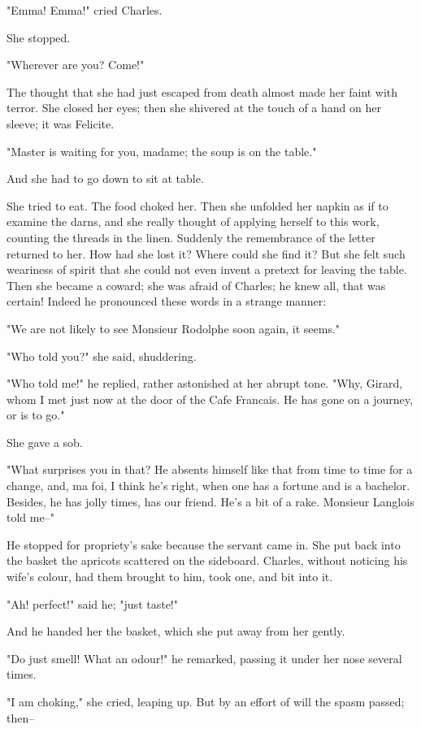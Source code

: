 \documentclass{tufte-book}
\begin{document}
"Emma! Emma!" cried Charles.

She stopped.

"Wherever are you? Come!"

The thought that she had just escaped from death almost made her faint
with terror. She closed her eyes; then she shivered at the touch of a
hand on her sleeve; it was Felicite.

"Master is waiting for you, madame; the soup is on the table."

And she had to go down to sit at table.

She tried to eat. The food choked her. Then she unfolded her napkin as
if to examine the darns, and she really thought of applying herself to
this work, counting the threads in the linen. Suddenly the remembrance
of the letter returned to her. How had she lost it? Where could she find
it? But she felt such weariness of spirit that she could not even invent
a pretext for leaving the table. Then she became a coward; she was
afraid of Charles; he knew all, that was certain! Indeed he pronounced
these words in a strange manner:

"We are not likely to see Monsieur Rodolphe soon again, it seems."

"Who told you?" she said, shuddering.

"Who told me!" he replied, rather astonished at her abrupt tone. "Why,
Girard, whom I met just now at the door of the Cafe Francais. He has
gone on a journey, or is to go."

She gave a sob.

"What surprises you in that? He absents himself like that from time
to time for a change, and, ma foi, I think he's right, when one has a
fortune and is a bachelor. Besides, he has jolly times, has our friend.
He's a bit of a rake. Monsieur Langlois told me--"

He stopped for propriety's sake because the servant came in. She put
back into the basket the apricots scattered on the sideboard. Charles,
without noticing his wife's colour, had them brought to him, took one,
and bit into it.

"Ah! perfect!" said he; "just taste!"

And he handed her the basket, which she put away from her gently.

"Do just smell! What an odour!" he remarked, passing it under her nose
several times.

"I am choking," she cried, leaping up. But by an effort of will the
spasm passed; then--
\end{document}
